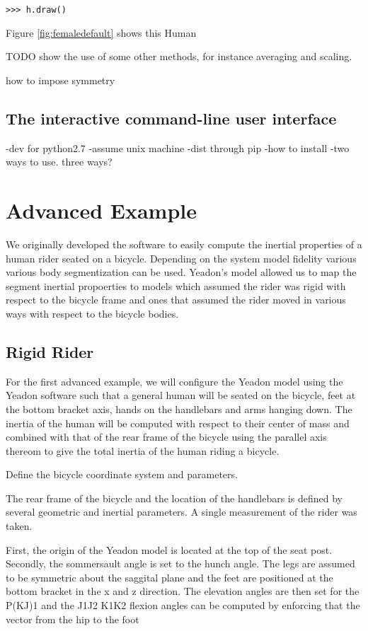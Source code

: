 \documentclass[10pt]{article}
\begin{document}
\begin{verbatim}
>>> h.draw()
\end{verbatim}

Figure \ref{fig:femaledefault} shows this Human

TODO show the use of some other methods, for instance averaging and scaling.

how to impose symmetry

\subsection*{The interactive command-line user interface}


-dev for python2.7
-assume unix machine
-dist through pip
-how to install
-two ways to use. three ways?



\section*{Advanced Example}
We originally developed the software to easily compute the inertial properties
of a human rider seated on a bicycle. Depending on the system model fidelity
various various body segmentization can be used. Yeadon's model allowed us to
map the segment inertial propoerties to models which assumed the rider was
rigid with respect to the bicycle frame and ones that assumed the rider moved
in various ways with respect to the bicycle bodies.

\subsection*{Rigid Rider}
For the first advanced example, we will configure the Yeadon model using the
Yeadon software such that a general human will be seated on the bicycle, feet
at the bottom bracket axis, hands on the handlebars and arms hanging down. The
inertia of the human will be computed with respect to their center of mass and
combined with that of the rear frame of the bicycle using the parallel axis
thereom to give the total inertia of the human riding a bicycle.

Define the bicycle coordinate system and parameters.

The rear frame of the bicycle  and the location of the handlebars is defined by
several geometric and inertial parameters. A single measurement of the rider
was taken.

First, the origin of the Yeadon model is located at the top of the seat post.
Secondly, the sommersault angle is set to the hunch angle. The legs are assumed
to be symmetric about the saggital plane and the feet are positioned at the
bottom bracket in the x and z direction. The elevation angles are then set for
the P(KJ)1 and the J1J2 K1K2 flexion angles can be computed by enforcing that
the vector from the hip to the foot
\end{document}
